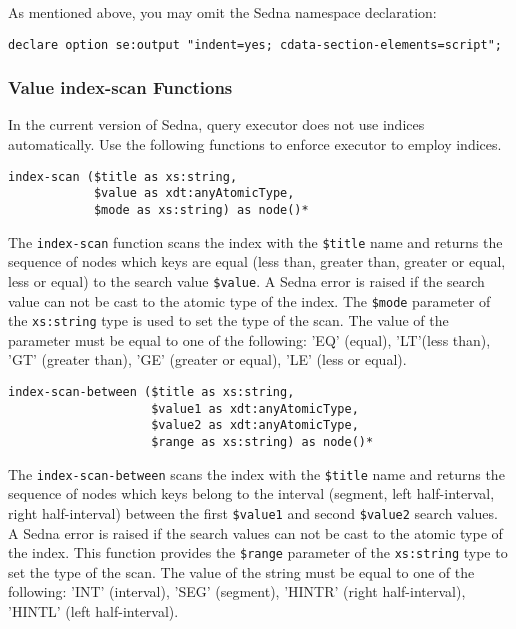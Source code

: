 \documentclass[a4paper,12pt]{article}
\begin{document}
As mentioned above, you may omit the Sedna namespace declaration:
\begin{verbatim}
declare option se:output "indent=yes; cdata-section-elements=script";
\end{verbatim}



\subsubsection{Value index-scan Functions}
\label{sec:value-index-scan-fun}

In the current version of Sedna, query executor does not use indices
automatically. Use the following functions to enforce executor to employ
indices.

\begin{verbatim}
index-scan ($title as xs:string,
            $value as xdt:anyAtomicType,
            $mode as xs:string) as node()*
\end{verbatim}

The \verb!index-scan! function scans the index with the \verb!$title! name and
returns the sequence of nodes which keys are equal (less than, greater than,
greater or equal, less or equal) to the search value \verb!$value!. A Sedna
error is raised if the search value can not be cast to the atomic type of the
index. The \verb!$mode! parameter of the \verb!xs:string! type is used to set
the type of the scan. The value of the parameter must be equal to one of the
following: 'EQ' (equal), 'LT'(less than), 'GT' (greater than), 'GE' (greater or
equal), 'LE' (less or equal).

\begin{verbatim}
index-scan-between ($title as xs:string,
                    $value1 as xdt:anyAtomicType,
                    $value2 as xdt:anyAtomicType,
                    $range as xs:string) as node()*
\end{verbatim}

The \verb!index-scan-between! scans the index with the \verb!$title! name and
returns the sequence of nodes which keys belong to the interval (segment, left
half-interval, right half-interval) between the first \verb!$value1! and second
\verb!$value2! search values. A Sedna error is raised if the search values can
not be cast to the atomic type of the index. This function provides the
\verb!$range! parameter of the \verb!xs:string! type to set the type of the
scan. The value of the string must be equal to one of the following: 'INT'
(interval), 'SEG' (segment), 'HINTR' (right half-interval), 'HINTL' (left
half-interval).
\end{document}
